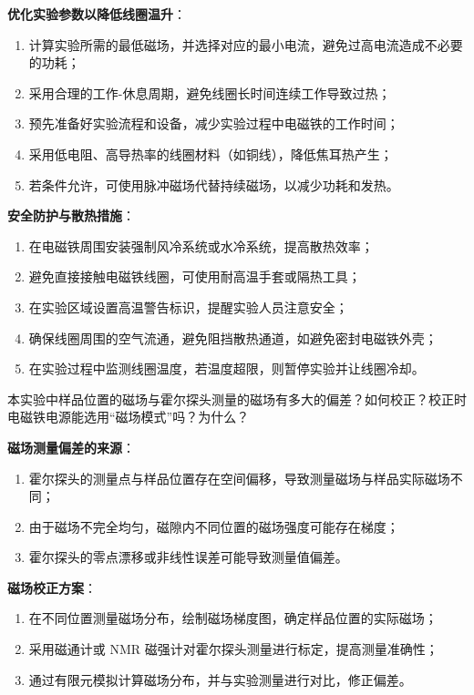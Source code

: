 \textbf{优化实验参数以降低线圈温升}：
\begin{enumerate}
    \item 计算实验所需的最低磁场，并选择对应的最小电流，避免过高电流造成不必要的功耗；
    \item 采用合理的工作-休息周期，避免线圈长时间连续工作导致过热；
    \item 预先准备好实验流程和设备，减少实验过程中电磁铁的工作时间；
    \item 采用低电阻、高导热率的线圈材料（如铜线），降低焦耳热产生；
    \item 若条件允许，可使用脉冲磁场代替持续磁场，以减少功耗和发热。
\end{enumerate}

\textbf{安全防护与散热措施}：
\begin{enumerate}
    \item 在电磁铁周围安装强制风冷系统或水冷系统，提高散热效率；
    \item 避免直接接触电磁铁线圈，可使用耐高温手套或隔热工具；
    \item 在实验区域设置高温警告标识，提醒实验人员注意安全；
    \item 确保线圈周围的空气流通，避免阻挡散热通道，如避免密封电磁铁外壳；
    \item 在实验过程中监测线圈温度，若温度超限，则暂停实验并让线圈冷却。
\end{enumerate}


\begin{question}
    本实验中样品位置的磁场与霍尔探头测量的磁场有多大的偏差？如何校正？校正时电磁铁电源能选用“磁场模式”吗？为什么？
\end{question}

\textbf{磁场测量偏差的来源}：
\begin{enumerate}
    \item 霍尔探头的测量点与样品位置存在空间偏移，导致测量磁场与样品实际磁场不同；
    \item 由于磁场不完全均匀，磁隙内不同位置的磁场强度可能存在梯度；
    \item 霍尔探头的零点漂移或非线性误差可能导致测量值偏差。
\end{enumerate}

\textbf{磁场校正方案}：
\begin{enumerate}
    \item 在不同位置测量磁场分布，绘制磁场梯度图，确定样品位置的实际磁场；
    \item 采用磁通计或 NMR 磁强计对霍尔探头测量进行标定，提高测量准确性；
    \item 通过有限元模拟计算磁场分布，并与实验测量进行对比，修正偏差。
\end{enumerate}

